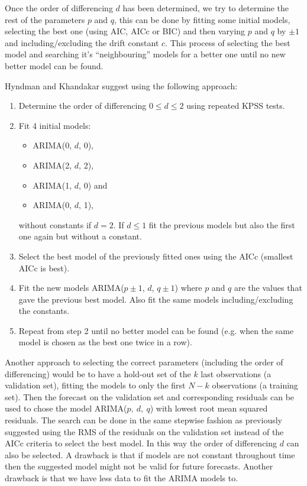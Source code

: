 \documentclass[a4paper, 12pt]{scrartcl}
\begin{document}
Once the order of differencing $d$ has been determined, we try to determine the rest of the parameters $p$ and $q$, this can be done by fitting some initial models, selecting the best one (using AIC, AICc or BIC) and then varying $p$ and $q$ by $\pm 1$ and including/excluding the drift constant $c$.
This process of selecting the best model and searching it's ``neighbouring'' models for a better one until no new better model can be found.

Hyndman and Khandakar \cite{art:hyndkhand} suggest using the following approach:
\begin{enumerate}
	\item Determine the order of differencing $0\leq d \leq 2$ using repeated KPSS tests.
	\item Fit 4 initial models:
	\begin{itemize}
		\item ARIMA(0, $d$, 0),
		\item ARIMA(2, $d$, 2),
		\item ARIMA(1, $d$, 0) and
		\item ARIMA(0, $d$, 1),
	\end{itemize}
	without constants if $d=2$. If $d\leq 1$ fit the previous models but also the first one again but without a constant.
	\item Select the best model of the previously fitted ones using the AICc (smallest AICc is best).
	\item Fit the new models ARIMA($p\pm1$, $d$, $q\pm1$) where $p$ and $q$ are the values that gave the previous best model. Also fit the same models including/excluding the constants.
	\item Repeat from step 2 until no better model can be found (e.g. when the same model is chosen as the best one twice in a row).
\end{enumerate}

Another approach to selecting the correct parameters (including the order of differencing) would be to have a hold-out set of the $k$ last observations (a validation set), fitting the models to only the first $N-k$ observations (a training set).
Then the forecast on the validation set and corresponding residuals can be used to chose the model ARIMA($p,~d,~q$) with lowest root mean squared residuals.
The search can be done in the same stepwise fashion as previously suggested using the RMS of the residuals on the validation set instead of the AICc criteria to select the best model.
In this way the order of differencing $d$ can also be selected.
A drawback is that if models are not constant throughout time then the suggested model might not be valid for future forecasts.
Another drawback is that we have less data to fit the ARIMA models to.
\end{document}
